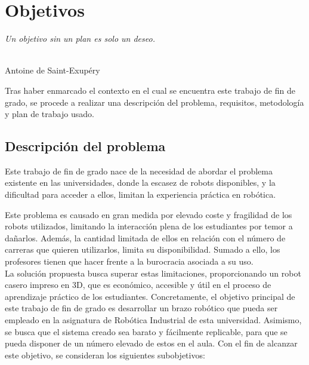 \chapter{Objetivos}
\label{cap:capitulo3}

\begin{flushright}
\begin{minipage}[]{10cm}
\emph{Un objetivo sin un plan es solo un deseo.}\\
\end{minipage}\\

Antoine de Saint-Exupéry\\
\end{flushright}

\vspace{1cm}

\noindent Tras haber enmarcado el contexto en el cual se encuentra este trabajo de fin de grado, se procede a realizar
una descripción del problema, requisitos, metodología y plan de trabajo usado.
\section{Descripción del problema}
\label{sec:descripcion}
\noindent Este trabajo de fin de grado nace de la necesidad de abordar el problema existente en las universidades, donde la escasez de 
robots disponibles, y la dificultad para acceder a ellos, limitan la experiencia práctica en robótica.

Este problema es causado en gran medida por elevado coste y fragilidad de los robots utilizados, limitando la interacción plena de 
los estudiantes por temor a dañarlos. Además, la cantidad limitada de ellos en relación con el número de carreras que 
quieren utilizarlos, limita su disponibilidad. Sumado a ello, los profesores tienen que hacer frente a la burocracia asociada a su uso.
\\ 
La solución propuesta busca superar estas limitaciones, proporcionando un robot casero impreso en 3D, que es
económico, accesible y útil en el proceso de aprendizaje práctico de los estudiantes. Concretamente, el objetivo 
principal de este trabajo de fin de grado es desarrollar un brazo robótico que pueda ser empleado en la 
asignatura de Robótica Industrial de esta universidad. Asimismo, se busca que el sistema creado sea barato y fácilmente replicable, para que 
se pueda disponer de un número elevado de estos en el aula.
\newpage
Con el fin de alcanzar este objetivo, se consideran los siguientes subobjetivos:

